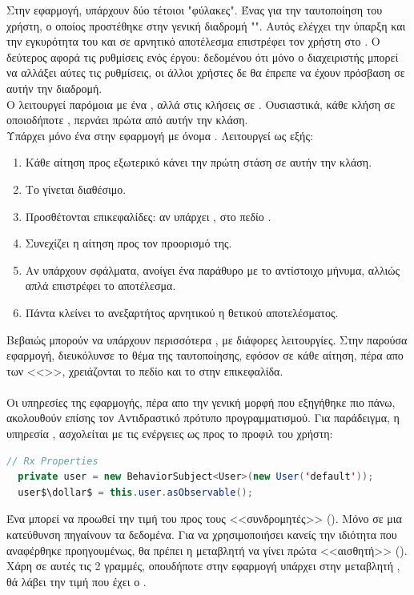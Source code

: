 \pSpace Στην εφαρμογή, υπάρχουν δύο τέτοιοι "φύλακες". Ένας για την ταυτοποίηση του χρήστη, ο οποίος προστέθηκε στην γενική διαδρομή "".  Αυτός ελέγχει την ύπαρξη και την εγκυρότητα του  και σε αρνητικό αποτέλεσμα επιστρέφει τον χρήστη στο . Ο δεύτερος  αφορά τις ρυθμίσεις ενός έργου: δεδομένου ότι μόνο ο διαχειριστής μπορεί να αλλάξει αύτες τις ρυθμίσεις, οι άλλοι χρήστες δε θα έπρεπε να έχουν πρόσβαση σε αυτήν την διαδρομή.\\
\pSpace Ο  λειτουργεί παρόμοια με ένα , αλλά στις κλήσεις σε . Ουσιαστικά, κάθε κλήση σε οποιοδήποτε , περνάει πρώτα από αυτήν την κλάση.\\
\pSpace Υπάρχει μόνο ένα  στην εφαρμογή με όνομα . Λειτουργεί ως εξής:
\begin{enumerate}
	\item Κάθε αίτηση προς εξωτερικό  κάνει την πρώτη στάση σε αυτήν την κλάση.
	\item Το  γίνεται διαθέσιμο.
	\item Προσθέτονται επικεφαλίδες: αν υπάρχει , στο πεδίο .
	\item Συνεχίζει η αίτηση προς τον προορισμό της.
	\item Αν υπάρχουν σφάλματα, ανοίγει ένα  παράθυρο με το αντίστοιχο μήνυμα, αλλιώς απλά επιστρέφει το αποτέλεσμα.
	\item Πάντα κλείνει το  ανεξαρτήτος αρνητικού η θετικού αποτελέσματος.
\end{enumerate}
\pSpace Βεβαιώς μπορούν να υπάρχουν περισσότερα , με διάφορες λειτουργίες. Στην παρούσα εφαρμογή, διευκόλυνσε το θέμα της ταυτοποίησης, εφόσον σε κάθε αίτηση, πέρα απο των <<>>, χρειάζονται το πεδίο  και το  στην επικεφαλίδα.\\
\\
\pSpace Οι υπηρεσίες της εφαρμογής, πέρα απο την γενική μορφή που εξηγήθηκε πιο πάνω, ακολουθούν επίσης τον Αντιδραστικό πρότυπο προγραμματισμού. Για παράδειγμα, η υπηρεσία , ασχολείται με τις ενέργειες ως προς το προφιλ του χρήστη:\\

	\begin{lstlisting}[language=Java]
// Rx Properties
  private user = new BehaviorSubject<User>(new User('default'));
  user$\dollar$ = this.user.asObservable();
	\end{lstlisting}
\pSpace Ένα  μπορεί να προωθεί την τιμή του προς τους <<συνδρομητές>> (). Μόνο σε μια κατεύθυνση πηγαίνουν τα δεδομένα. Για να χρησιμοποιήσει κανείς την ιδιότητα  που αναφέρθηκε προηγουμένως, θα πρέπει η μεταβλητή να γίνει πρώτα <<αισθητή>> (). Χάρη σε αυτές τις 2 γραμμές, οπουδήποτε στην εφαρμογή υπάρχει  στην μεταβλητή , θά λάβει την τιμή που έχει ο .\\

